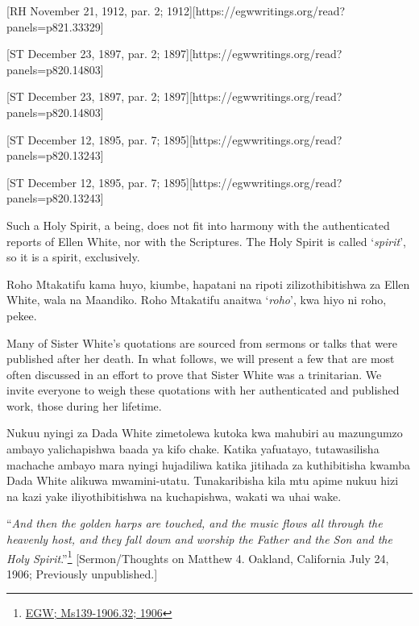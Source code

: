 [RH November 21, 1912, par. 2; 1912][https://egwwritings.org/read?panels=p821.33329]


[ST December 23, 1897, par. 2; 1897][https://egwwritings.org/read?panels=p820.14803]


[ST December 23, 1897, par. 2; 1897][https://egwwritings.org/read?panels=p820.14803]


[ST December 12, 1895, par. 7; 1895][https://egwwritings.org/read?panels=p820.13243]


[ST December 12, 1895, par. 7; 1895][https://egwwritings.org/read?panels=p820.13243]


Such a Holy Spirit, a being, does not fit into harmony with the authenticated reports of Ellen White, nor with the Scriptures. The Holy Spirit is called ‘\textit{spirit}’, so it is a spirit, exclusively.


Roho Mtakatifu kama huyo, kiumbe, hapatani na ripoti zilizothibitishwa za Ellen White, wala na Maandiko. Roho Mtakatifu anaitwa ‘\textit{roho}’, kwa hiyo ni roho, pekee.


Many of Sister White’s quotations are sourced from sermons or talks that were published after her death. In what follows, we will present a few that are most often discussed in an effort to prove that Sister White was a trinitarian. We invite everyone to weigh these quotations with her authenticated and published work, those during her lifetime.


Nukuu nyingi za Dada White zimetolewa kutoka kwa mahubiri au mazungumzo ambayo yalichapishwa baada ya kifo chake. Katika yafuatayo, tutawasilisha machache ambayo mara nyingi hujadiliwa katika jitihada za kuthibitisha kwamba Dada White alikuwa mwamini-utatu. Tunakaribisha kila mtu apime nukuu hizi na kazi yake iliyothibitishwa na kuchapishwa, wakati wa uhai wake.


“\textit{And then the golden harps are touched, and the music flows all through the heavenly host, and they fall down and worship the Father and the Son and the Holy Spirit}.”\footnote{\href{https://egwwritings.org/?ref=en_Ms139-1906.32&para=9579.38}{EGW; Ms139-1906.32; 1906}} [Sermon/Thoughts on Matthew 4. Oakland, California July 24, 1906; Previously unpublished.]


